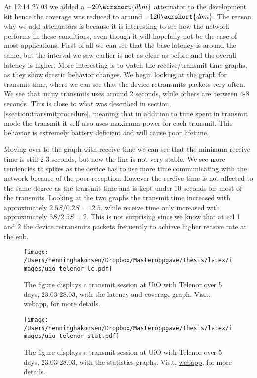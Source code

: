 \documentclass[USenglish]{ifimaster}  %
\begin{document}
At 12:14 27.03 we added a ${-20 \acrshort{dbm}}$ attenuator to the development kit hence the coverage was reduced to around ${-120 \acrshort{dbm}}$. The reason why we add attenuators is because it is interesting to see how the network performs in these conditions, even though it will hopefully not be the case of most applications. First of all we can see that the base latency is around the same, but the interval we saw earlier is not as clear as before and the overall latency is higher. More interesting is to watch the receive/transmit time graphs, as they show drastic behavior changes. We begin looking at the graph for transmit time, where we can see that the device retransmits packets very often. We see that many transmits uses around 2 seconds, while others are between 4-8 seconds. This is close to what was described in section, \vref{ssection:transmitprocedure}, meaning that in addition to time spent in transmit mode the transmit it self also uses maximum power for each transmit. This behavior is extremely battery deficient and will cause poor lifetime.

Moving over to the graph with receive time we can see that the minimum receive time is still 2-3 seconds, but now the line is not very stable. We see more tendencies to spikes as the device has to use more time communicating with the network because of the poor reception. However the receive time is not affected to the same degree as the transmit time and is kept under 10 seconds for most of the transmits. Looking at the two graphs the transmit time increased with approximately ${2.5S / 0.2S = 12.5}$, while receive time only increased with approximately ${5S / 2.5S = 2}$. This is not surprising since we know that at \acrshort{ecl} 1 and 2 the device retransmits packets frequently to achieve higher receive rate at the \acrshort{enb}.

\begin{figure}[H]
  \centering
  \texttt{[image: /Users/henninghakonsen/Dropbox/Masteroppgave/thesis/latex/images/uio\_telenor\_lc.pdf]}
  \caption[Long-term test - Telenor 23.03-28.03, latency and coverage]{The figure displays a transmit session at UiO with Telenor over 5 days, 23.03-28.03, with the latency and coverage graph. Visit, \href{http://158.39.77.97:9000/\#/nodes/id2}{webapp}, for more details.}
  \label{figure:uio_telenor_lc}
\end{figure}

\begin{figure}[H]
  \centering
  \texttt{[image: /Users/henninghakonsen/Dropbox/Masteroppgave/thesis/latex/images/uio\_telenor\_stat.pdf]}
  \caption[Long-term test - Telenor 23.03-28.03, statistics]{The figure displays a transmit session at UiO with Telenor over 5 days, 23.03-28.03, with the statistics graphs. Visit, \href{http://158.39.77.97:9000/\#/nodes/id2}{webapp}, for more details.}
  \label{figure:uio_telenor_stat}
\end{figure}
\end{document}
